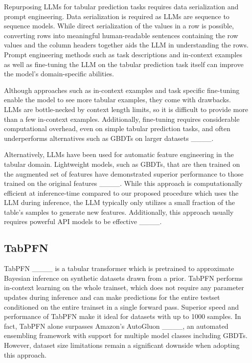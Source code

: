 Repurposing LLMs for tabular prediction tasks requires data serialization and prompt engineering. Data serialization is required as LLMs are sequence to sequence models. While direct serialization of the values in a row is possible, converting rows into meaningful human-readable sentences containing the row values and the column headers together aids the LLM in understanding the rows. Prompt engineering methods such as task descriptions and in-context examples as well as fine-tuning the LLM on the tabular prediction task itself can improve the model's domain-specific abilities. 

Although approaches such as in-context examples and task specific fine-tuning enable the model to see more tabular examples, they come with drawbacks. LLMs are bottle-necked by context length limits, so it is difficult to provide more than a few in-context examples. Additionally, fine-tuning requires considerable computational overhead, even on simple tabular prediction tasks, and often underperforms alternatives such as GBDTs on larger datasets ____.

Alternatively, LLMs have been used for automatic feature engineering in the tabular domain. Lightweight models, such as GBDTs, that are then trained on the augmented set of features have demonstrated superior performance to those trained on the original features ____. While this approach is computationally efficient at inference-time compared to our proposed procedure which uses the LLM during inference, the LLM typically only utilizes a small fraction of the table's samples to generate new features. Additionally, this approach usually requires powerful API models to be effective ____.

\subsection{TabPFN}
TabPFN ____ is a tabular transformer which is pretrained to approximate Bayesian inference on synthetic datasets drawn from a prior. TabPFN performs in-context learning on the whole trainset, which does not require any parameter updates during inference and can make predictions for the entire testset conditioned on the entire trainset in a single forward pass. Superior speed and performance of TabPFN make it ideal for datasets with up to 1000 samples. In fact, TabPFN alone surpasses Amazon's AutoGluon ____, an automated ensembling framework with support for multiple model classes including GBDTs. However, dataset size limitations remain a significant downside when adopting this approach.

